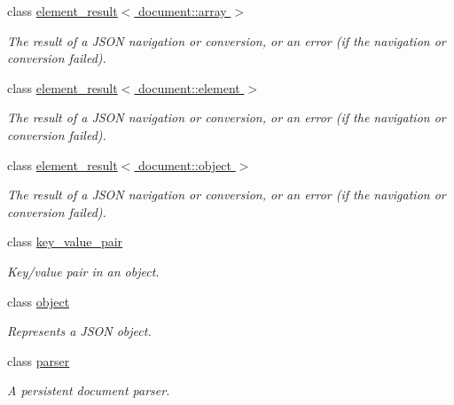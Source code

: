 \begin{DoxyCompactItemize}
class \hyperlink{classsimdjson_1_1document_1_1element__result_3_01document_1_1array_01_4}{element\+\_\+result$<$ document\+::array $>$}
\begin{DoxyCompactList}\small\item\em The result of a J\+S\+ON navigation or conversion, or an error (if the navigation or conversion failed). \end{DoxyCompactList}\item 
class \hyperlink{classsimdjson_1_1document_1_1element__result_3_01document_1_1element_01_4}{element\+\_\+result$<$ document\+::element $>$}
\begin{DoxyCompactList}\small\item\em The result of a J\+S\+ON navigation or conversion, or an error (if the navigation or conversion failed). \end{DoxyCompactList}\item 
class \hyperlink{classsimdjson_1_1document_1_1element__result_3_01document_1_1object_01_4}{element\+\_\+result$<$ document\+::object $>$}
\begin{DoxyCompactList}\small\item\em The result of a J\+S\+ON navigation or conversion, or an error (if the navigation or conversion failed). \end{DoxyCompactList}\item 
class \hyperlink{classsimdjson_1_1document_1_1key__value__pair}{key\+\_\+value\+\_\+pair}
\begin{DoxyCompactList}\small\item\em Key/value pair in an object. \end{DoxyCompactList}\item 
class \hyperlink{classsimdjson_1_1document_1_1object}{object}
\begin{DoxyCompactList}\small\item\em Represents a J\+S\+ON object. \end{DoxyCompactList}\item 
class \hyperlink{classsimdjson_1_1document_1_1parser}{parser}
\begin{DoxyCompactList}\small\item\em A persistent document parser. \end{DoxyCompactList}\end{DoxyCompactItemize}
